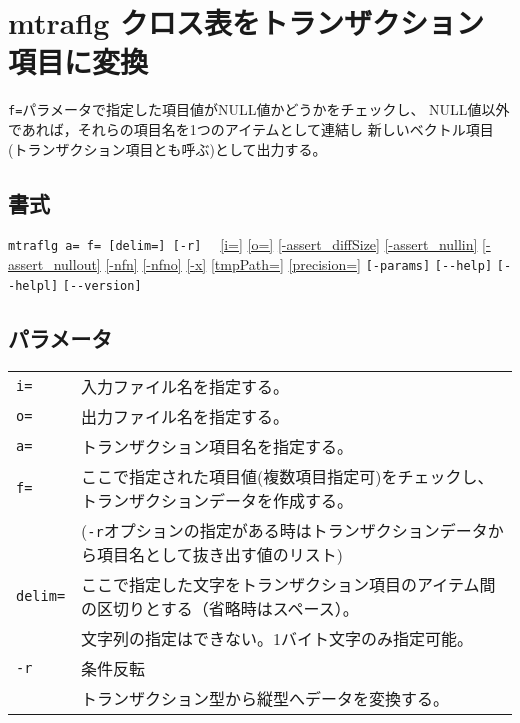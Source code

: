 
%

\section{mtraflg クロス表をトランザクション項目に変換\label{sect:mtraflg}}
\verb|f=|パラメータで指定した項目値がNULL値かどうかをチェックし、
NULL値以外であれば，それらの項目名を1つのアイテムとして連結し
新しいベクトル項目(トランザクション項目とも呼ぶ)として出力する。

\subsection*{書式}
\verb|mtraflg a= f= [delim=] [-r]  | 
\hyperref[sect:option_i]{[i=]}
\hyperref[sect:option_o]{[o=]}
\hyperref[sect:option_assert_diffSize]{[-assert\_diffSize]}
\hyperref[sect:option_assert_nullin]{[-assert\_nullin]}
\hyperref[sect:option_assert_nullout]{[-assert\_nullout]}
\hyperref[sect:option_nfn]{[-nfn]} 
\hyperref[sect:option_nfno]{[-nfno]}  
\hyperref[sect:option_x]{[-x]}
\hyperref[sect:option_option_tmppath]{[tmpPath=]}
\hyperref[sect:option_precision]{[precision=]}
\verb|[-params]|
\verb|[--help]|
\verb|[--helpl]|
\verb|[--version]|\\

\subsection*{パラメータ}
\begin{table}[htbp]
{\small
\begin{tabular}{ll}
\verb|i=|    & 入力ファイル名を指定する。\\
\verb|o=|    & 出力ファイル名を指定する。\\
\verb|a=|      & トランザクション項目名を指定する。\\
\verb|f=|      & ここで指定された項目値(複数項目指定可)をチェックし、トランザクションデータを作成する。\\
               & (\verb|-r|オプションの指定がある時はトランザクションデータから項目名として抜き出す値のリスト)\\
\verb|delim=|  & ここで指定した文字をトランザクション項目のアイテム間の区切りとする（省略時はスペース）。\\
               & 文字列の指定はできない。1バイト文字のみ指定可能。\\
\verb|-r|      & 条件反転\\
               & トランザクション型から縦型へデータを変換する。\\
\end{tabular} 
}
\end{table} 

